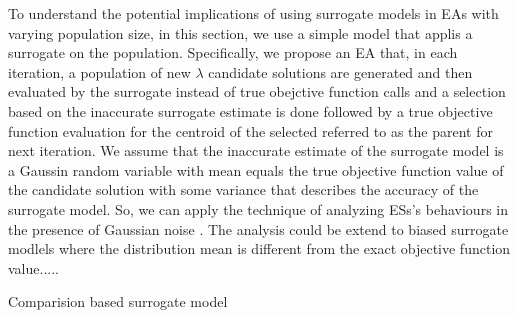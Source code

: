 To understand the potential implications of using surrogate models in EAs with varying population size, in this section, we use a simple model that applis a surrogate on the population. Specifically, we propose an EA that, in each iteration, a population of new $\lambda$ candidate solutions are generated and then evaluated by the surrogate instead of true obejctive function calls and a selection based on the inaccurate surrogate estimate is done followed by a true objective function evaluation for the centroid of the selected referred to as the parent for next iteration. We assume that the inaccurate estimate of the surrogate model is a Gaussin random variable with mean equals the true objective function value of the candidate solution with some variance that describes the accuracy of the surrogate model. So, we can apply the technique of analyzing ESs's behaviours in the presence of Gaussian noise \cite{arnold2002noisy}. The analysis could be extend to biased surrogate modlels where the distribution mean is different from the exact objective function value\cite{DBLP:conf/ppsn/KayhaniA18}.....


Comparision based surrogate model 

